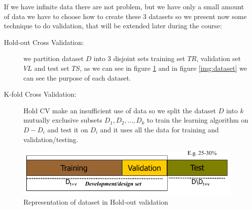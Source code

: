\begin{description}
                         If we have infinite data there are not problem, but we have only a small amount of data
                         we have to choose how to create these $3$ datasets so we present now some technique
                         to do validation, that will be extended later during the course:
                         \begin{description}
                             \item [Hold-out Cross Validation: ] we partition dataset $D$ into $3$ disjoint sets
                                    training set $TR$, validation set $VL$ and test set $TS$, as we can see
                                    in figure \ref{img:hold-out} and in figure \ref{img:dataset} we can see
                                    the purpose of each dataset.
                             
                            \item [K-fold Cross Validation: ] Hold CV make an insufficient use of data so we 
                                  split the dataset $D$ into $k$ mutually exclusive subsets $D_1, D_2, \dots, D_k$
                                  to train the learning algorithm on $D - D_i$ and test it on $D_i$ and it uses
                                  all the data for training and validation/testing.
                        \end{description}

                        \begin{figure}
                            \caption{Representation of dataset in Hold-out validation}
                            \label{img:hold-out}
                            \includegraphics[width=\textwidth]{images/holdOut}
                        \end{figure}


\end{description}
